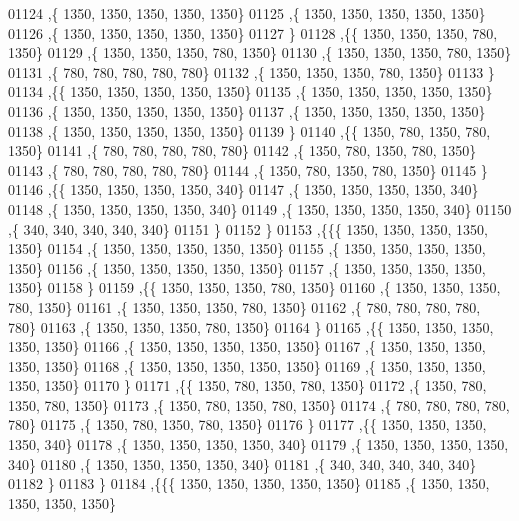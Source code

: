 \begin{DoxyCode}
01124    ,\{  1350,  1350,  1350,  1350,  1350\}
01125    ,\{  1350,  1350,  1350,  1350,  1350\}
01126    ,\{  1350,  1350,  1350,  1350,  1350\}
01127    \}
01128   ,\{\{  1350,  1350,  1350,   780,  1350\}
01129    ,\{  1350,  1350,  1350,   780,  1350\}
01130    ,\{  1350,  1350,  1350,   780,  1350\}
01131    ,\{   780,   780,   780,   780,   780\}
01132    ,\{  1350,  1350,  1350,   780,  1350\}
01133    \}
01134   ,\{\{  1350,  1350,  1350,  1350,  1350\}
01135    ,\{  1350,  1350,  1350,  1350,  1350\}
01136    ,\{  1350,  1350,  1350,  1350,  1350\}
01137    ,\{  1350,  1350,  1350,  1350,  1350\}
01138    ,\{  1350,  1350,  1350,  1350,  1350\}
01139    \}
01140   ,\{\{  1350,   780,  1350,   780,  1350\}
01141    ,\{   780,   780,   780,   780,   780\}
01142    ,\{  1350,   780,  1350,   780,  1350\}
01143    ,\{   780,   780,   780,   780,   780\}
01144    ,\{  1350,   780,  1350,   780,  1350\}
01145    \}
01146   ,\{\{  1350,  1350,  1350,  1350,   340\}
01147    ,\{  1350,  1350,  1350,  1350,   340\}
01148    ,\{  1350,  1350,  1350,  1350,   340\}
01149    ,\{  1350,  1350,  1350,  1350,   340\}
01150    ,\{   340,   340,   340,   340,   340\}
01151    \}
01152   \}
01153  ,\{\{\{  1350,  1350,  1350,  1350,  1350\}
01154    ,\{  1350,  1350,  1350,  1350,  1350\}
01155    ,\{  1350,  1350,  1350,  1350,  1350\}
01156    ,\{  1350,  1350,  1350,  1350,  1350\}
01157    ,\{  1350,  1350,  1350,  1350,  1350\}
01158    \}
01159   ,\{\{  1350,  1350,  1350,   780,  1350\}
01160    ,\{  1350,  1350,  1350,   780,  1350\}
01161    ,\{  1350,  1350,  1350,   780,  1350\}
01162    ,\{   780,   780,   780,   780,   780\}
01163    ,\{  1350,  1350,  1350,   780,  1350\}
01164    \}
01165   ,\{\{  1350,  1350,  1350,  1350,  1350\}
01166    ,\{  1350,  1350,  1350,  1350,  1350\}
01167    ,\{  1350,  1350,  1350,  1350,  1350\}
01168    ,\{  1350,  1350,  1350,  1350,  1350\}
01169    ,\{  1350,  1350,  1350,  1350,  1350\}
01170    \}
01171   ,\{\{  1350,   780,  1350,   780,  1350\}
01172    ,\{  1350,   780,  1350,   780,  1350\}
01173    ,\{  1350,   780,  1350,   780,  1350\}
01174    ,\{   780,   780,   780,   780,   780\}
01175    ,\{  1350,   780,  1350,   780,  1350\}
01176    \}
01177   ,\{\{  1350,  1350,  1350,  1350,   340\}
01178    ,\{  1350,  1350,  1350,  1350,   340\}
01179    ,\{  1350,  1350,  1350,  1350,   340\}
01180    ,\{  1350,  1350,  1350,  1350,   340\}
01181    ,\{   340,   340,   340,   340,   340\}
01182    \}
01183   \}
01184  ,\{\{\{  1350,  1350,  1350,  1350,  1350\}
01185    ,\{  1350,  1350,  1350,  1350,  1350\}

\end{DoxyCode}
